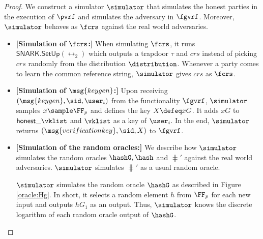 \begin{proof}
	We construct a simulator $ \simulator $ that simulates the honest parties in the execution of $ \pvrf  $ and simulates the adversary in $ \fgvrf $. Moreover,
	$ \simulator $ behaves as $ \fcrs $ against the real world adversaries. 
	\begin{itemize}
		\item \textbf{[Simulation of $ \fcrs $:] }When simulating $ \fcrs $, it runs $ \mathsf{SNARK}.\mathsf{SetUp}(\rel_2) $ which outputs a trapdoor $ \tau $ and $ crs $ instead of picking $ crs $ randomly from the distribution $ \distribution $. Whenever a party comes to learn the common reference string, $ \simulator $ gives $ crs $ as  $ \fcrs $.
		
		\item \textbf{[Simulation of $ \msg{keygen} $:]} Upon receiving $(\msg{keygen}, \sid, \user_i)$ from the functionality $\fgvrf$, $ \simulator $ samples $x \sample \FF_p$ and defines the key $X \defeq xG$. It adds $ xG $ to $ \hkeys $ and $ \vklist $ as a key of $ \user_i $. 
		In the end, $ \simulator $ returns $(\msg{verificationkey}, \sid, X)$ to $\fgvrf$. %
		
		\item\textbf{[Simulation of the random oracles:]} We  describe how $ \simulator $ simulates the random oracles $ \hashG, \hash $ and $ \hash' $ against the real world adversaries. 	$ \simulator $ simulates  $ \hash' $  as a usual random oracle.
		
		$ \simulator $ simulates the random oracle $ \hashG $ as described in Figure \ref{oracle:Hg}. In short, it selects a random element  $ h $ from $ \FF_p $ for each new input and outputs $ hG_1 $ as an output. Thus, $ \simulator $ knows the discrete logarithm of each random oracle output of $\hashG  $.
		\begin{figure}
			\centering
			
			\noindent{}
\end{figure}
\end{itemize}
\end{proof}
